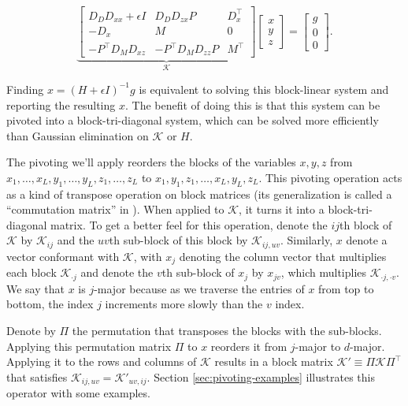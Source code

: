 \documentclass{article}
\newcommand{\K}{\mathcal{K}}
\begin{document}
\begin{equation}
  \label{eq:unified-system}
  \underbrace{
    \begin{bmatrix}
      D_D D_{xx} + \epsilon I & D_D D_{zx} P         & D_x^\top \\
      -D_x                    & M                    & 0        \\
      -P^\top D_M D_{xz}      & -P^\top D_M D_{zz} P & M^\top
    \end{bmatrix}
  }_{\K}
  \begin{bmatrix}
    x \\ y \\ z
  \end{bmatrix}
  =
  \begin{bmatrix}
    g \\ 0 \\ 0
  \end{bmatrix}.
\end{equation}

Finding $x = \left(H+\epsilon I\right)^{-1}g$ is equivalent to solving this block-linear system and
reporting the resulting $x$. The benefit of doing this is that
this system can be pivoted into a block-tri-diagonal system, which can be solved more
efficiently than Gaussian elimination on $\K$ or $H$.

The pivoting we'll apply reorders the blocks of the variables $x,y,z$ from
$x_1,\ldots,x_L, y_1,\ldots, y_L, z_1,\ldots, z_L$ to
$x_1,y_1,z_1,\dots,x_L,y_L,z_L$. This pivoting operation acts as a kind of
transpose operation on block matrices (its generalization is called a
``commutation matrix'' in \cite{magnus-neudecker}). When applied to $\K$, it turns
it into a block-tri-diagonal matrix.  To get a better feel for this operation,
denote the $ij$th block of $\K$ by $\K_{ij}$ and the $uv$th sub-block of this
block by $\K_{ij,uv}$.  Similarly, $x$ denote a vector conformant with $\K$,
with $x_j$ denoting the column vector that multiplies each block $\K_{\cdot j}$
and denote the $v$th sub-block of $x_j$ by $x_{jv}$, which multiplies $\K_{\cdot
    j,\cdot v}$.  We say that $x$ is $j$-major because as we traverse the entries of
$x$ from top to bottom, the index $j$ increments more slowly than the $v$ index.

Denote by $\Pi$ the permutation that transposes the
blocks with the sub-blocks.  Applying this permutation matrix $\Pi$ to $x$ reorders
it from $j$-major to $d$-major. Applying it to the rows and
columns of $\K$ results in a block matrix $\K' \equiv \Pi
  \K \Pi^\top$ that satisfies $\K_{ij,uv} = \K'_{uv,ij}$.
Section \ref{sec:pivoting-examples} illustrates this operator with some examples.
\end{document}
